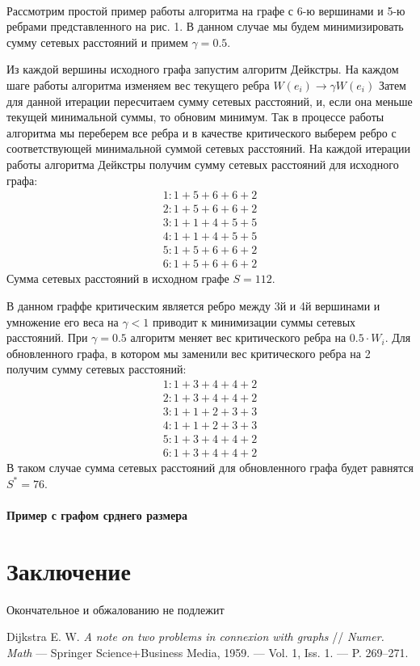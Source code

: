 \documentclass[12pt]{article}
\begin{document}
\paragraph{}

Рассмотрим простой пример работы алгоритма на графе с 6-ю вершинами и 5-ю ребрами
представленного на рис. 1. В данном случае мы будем минимизировать сумму сетевых расстояний и
примем $\gamma = 0.5$.

Из каждой вершины исходного графа запустим алгоритм Дейкстры.
На каждом шаге работы алгоритма изменяем вес текущего ребра $W(e_i) \rightarrow \gamma W(e_i)$
Затем для данной итерации пересчитаем сумму сетевых расстояний, и, если она меньше текущей минимальной суммы,
то обновим минимум. Так в процессе работы алгоритма мы переберем все ребра и в качестве критического выберем 
ребро с соответствующей минимальной суммой сетевых расстояний. 
На каждой итерации работы алгоритма Дейкстры получим сумму сетевых расстояний для исходного графа:
\begin{gather}
1 : 1 + 5 + 6 + 6 + 2 \\
2 : 1 + 5 + 6 + 6 + 2 \\
3 : 1 + 1 + 4 + 5 + 5 \\
4 : 1 + 1 + 4 + 5 + 5 \\
5 : 1 + 5 + 6 + 6 + 2 \\
6 : 1 + 5 + 6 + 6 + 2
\end{gather}
Сумма сетевых расстояний в исходном графе $S = 112$. 

В данном граффе критическим является ребро между
3й и 4й вершинами и умножение его веса на
$\gamma < 1$ приводит к минимизации суммы сетевых расстояний.
При $\gamma = 0.5$ алгоритм меняет вес критического ребра на $0.5 \cdot W_i$.
Для обновленного графа, в котором мы заменили вес критического ребра на 2 получим сумму сетевых расстояний:
\begin{gather}
1 : 1 + 3 + 4 + 4 + 2 \\
2 : 1 + 3 + 4 + 4 + 2 \\
3 : 1 + 1 + 2 + 3 + 3 \\
4 : 1 + 1 + 2 + 3 + 3 \\
5 : 1 + 3 + 4 + 4 + 2 \\
6 : 1 + 3 + 4 + 4 + 2
\end{gather}
В таком случае сумма сетевых расстояний для обновленного графа будет равнятся $S^* = 76$.

\paragraph{Пример с графом срднего размера}

\section{Заключение}
Окончательное и обжалованию не подлежит

\begin{thebibliography}{9}
Dijkstra E. W. \textit{A note on two problems in connexion with graphs} //
\textit{Numer. Math} — Springer Science+Business Media, 1959.
— Vol. 1, Iss. 1. — P. 269–271.
\end{thebibliography}
\end{document}
